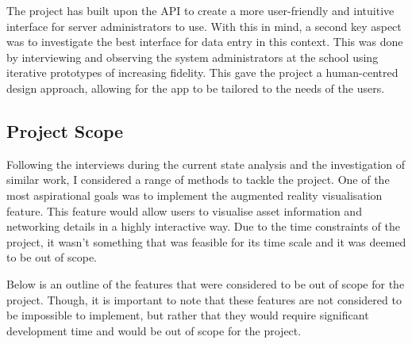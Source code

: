 \documentclass [11pt,a4paper]{article}
\begin{document}
The project has built upon the API to create a more user-friendly and intuitive interface for server administrators to use. With this in mind, a second key aspect was to investigate the best interface for data entry in this context. This was done by interviewing and observing the system administrators at the school using iterative prototypes of increasing fidelity. This gave the project a human-centred design approach, allowing for the app to be tailored to the needs of the users.

\subsection{Project Scope}
\label{sec:stretchgoals}

Following the interviews during the current state analysis and the investigation of similar work, I considered a range of methods to tackle the project. One of the most aspirational goals was to implement the augmented reality visualisation feature. This feature would allow users to visualise asset information and networking details in a highly interactive way. Due to the time constraints of the project, it wasn't something that was feasible for its time scale and it was deemed to be out of scope. 

Below is an outline of the features that were considered to be out of scope for the project. Though, it is important to note that these features are not considered to be impossible to implement, but rather that they would require significant development time and would be out of scope for the project.
\end{document}
